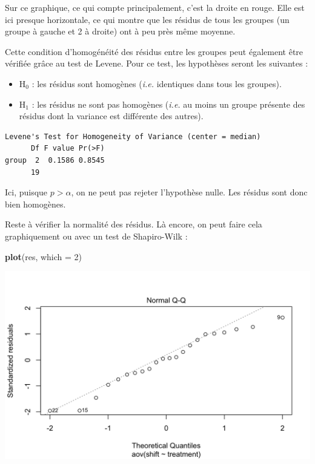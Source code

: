 \documentclass[a4paperpaper,]{article}
\newenvironment{Shaded}{\begin{snugshade}}{\end{snugshade}}
\newcommand{\DataTypeTok}[1]{\textcolor[rgb]{0.00,0.34,0.68}{#1}}
\newcommand{\DecValTok}[1]{\textcolor[rgb]{0.69,0.50,0.00}{#1}}
\newcommand{\KeywordTok}[1]{\textcolor[rgb]{0.12,0.11,0.11}{\textbf{#1}}}
\newcommand{\NormalTok}[1]{\textcolor[rgb]{0.12,0.11,0.11}{#1}}
\newcommand{\OperatorTok}[1]{\textcolor[rgb]{0.12,0.11,0.11}{#1}}
\newcommand{\StringTok}[1]{\textcolor[rgb]{0.75,0.01,0.01}{#1}}
\providecommand{\tightlist}{%
  \setlength{\itemsep}{0pt}\setlength{\parskip}{0pt}}
\begin{document}
Sur ce graphique, ce qui compte principalement, c'est la droite en rouge. Elle est ici presque horizontale, ce qui montre que les résidus de tous les groupes (un groupe à gauche et 2 à droite) ont à peu près même moyenne.

Cette condition d'homogénéité des résidus entre les groupes peut également être vérifiée grâce au test de Levene. Pour ce test, les hypothèses seront les suivantes :

\begin{itemize}
\tightlist
\item
  H\(_0\) : les résidus sont homogènes (\emph{i.e.} identiques dans tous les groupes).
\item
  H\(_1\) : les résidus ne sont pas homogènes (\emph{i.e.} au moins un groupe présente des résidus dont la variance est différente des autres).
\end{itemize}

\begin{Shaded}
\end{Shaded}

\begin{verbatim}
Levene's Test for Homogeneity of Variance (center = median)
      Df F value Pr(>F)
group  2  0.1586 0.8545
      19               
\end{verbatim}

Ici, puisque \(p > \alpha\), on ne peut pas rejeter l'hypothèse nulle. Les résidus sont donc bien homogènes.

Reste à vérifier la normalité des résidus. Là encore, on peut faire cela graphiquement ou avec un test de Shapiro-Wilk :

\begin{Shaded}
\begin{Highlighting}[]
\KeywordTok{plot}\NormalTok{(res, }\DataTypeTok{which =} \DecValTok{2}\NormalTok{)}
\end{Highlighting}
\end{Shaded}

\begin{center}\includegraphics[width=0.9\linewidth]{figure/unnamed-chunk-83-1} \end{center}
\end{document}

